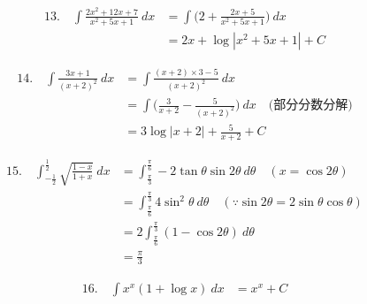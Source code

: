 \documentclass[autodetect-engine,ja=standard, 10.5pt, a4paper, titlepage]{bxjsarticle}
\numberwithin{equation}{section} %
\begin{document}







  \begin{fleqn}[0pt]
    \begin{align*}
      13.\quad \int \frac{2x^2 + 12x + 7}{x^2 + 5x + 1} \:dx
      &= \int \biggl( 2 + \frac{2x + 5}{x^2 + 5x + 1} \biggr) \:dx \\
      &= 2x + \log|x^2 + 5x + 1| + C
    \end{align*}
  \end{fleqn}

  \begin{fleqn}[0pt]
    \begin{align*}
      14.\quad \int \frac{3x + 1}{(x+2)^2} \:dx
      &= \int \frac{(x + 2)\times 3 - 5}{(x + 2)^2} \:dx \\
      &= \int \biggl( \frac{3}{x+2} - \frac{5}{(x+2)^2} \biggr) \:dx \quad\text{(部分分数分解)} \\
      &= 3\log|x+2| + \frac{5}{x+2} + C
    \end{align*}
  \end{fleqn}

  \begin{fleqn}[0pt]
    \begin{align*}
      15.\quad \int_{-\frac{1}{2}}^{\frac{1}{2}} \sqrt{\frac{1-x}{1+x}} \:dx
      &= \int_{\frac{\pi}{3}}^{\frac{\pi}{6}} -2\tan\theta \sin 2\theta \:d\theta \quad (x = \cos 2\theta)\\
      &= \int_{\frac{\pi}{6}}^{\frac{\pi}{3}} 4\sin^2\theta \:d\theta \quad (\because \sin 2\theta = 2\sin\theta\cos\theta)\\
      &= 2\int_{\frac{\pi}{6}}^{\frac{\pi}{3}} (1-\cos 2\theta) \:d\theta \\
      &= \frac{\pi}{3}
    \end{align*}
  \end{fleqn}

  \begin{fleqn}[0pt]
    \begin{align*}
      16.\quad \int x^x(1+\log x) \:dx
      &= x^x + C
    \end{align*}
  \end{fleqn}
\end{document}
